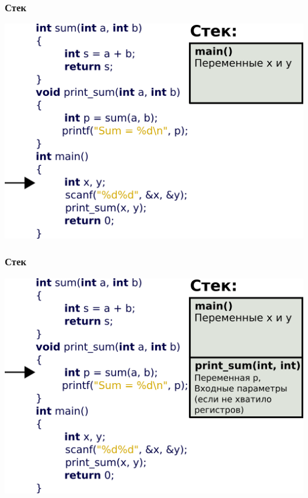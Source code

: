 \documentclass[12pt,pdf,hyperref={unicode}]{beamer}
\begin{document}
\begin{frame}[fragile]
\frametitle{Стек} 
\begin{center}
\includegraphics[width=\linewidth]{images/stack1.png}
\end{center}
\end{frame}

\begin{frame}[fragile]
\frametitle{Стек} 
\begin{center}
\includegraphics[width=\linewidth]{images/stack2.png}
\end{center}
\end{frame}
\end{document}
